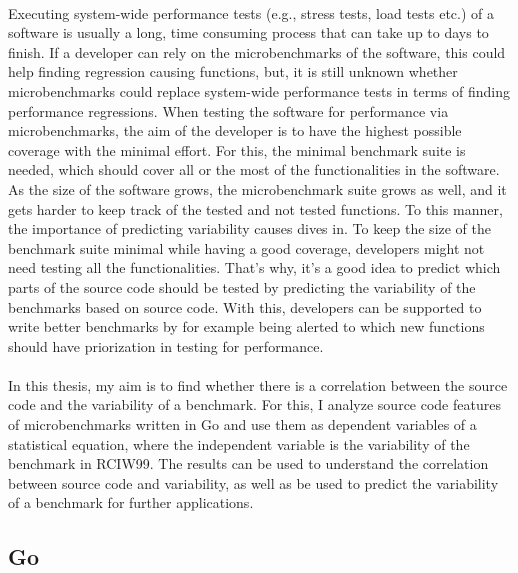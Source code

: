 \documentclass{seal_thesis}
\begin{document}
\\
Executing system-wide performance tests (e.g., stress tests, load tests etc.) of a software is usually a long, time consuming process that can take up to days to finish\cite{Laaber:2018:EOS:3196398.3196407}. If a developer can rely on the microbenchmarks of the software, this could help finding regression causing functions, but, it is still unknown whether microbenchmarks could replace system-wide performance tests in terms of finding performance regressions. When testing the software for performance via microbenchmarks, the aim of the developer is to have the highest possible coverage  with the minimal effort. For this, the minimal benchmark suite is needed, which should cover all or the most of the functionalities in the software. As the size of the software grows, the microbenchmark suite grows as well, and it gets harder to keep track of the tested and not tested functions. To this manner, the importance of predicting variability causes dives in. To keep the size of the benchmark suite minimal while having a good coverage, developers might not need testing all the functionalities. That's why, it's a good idea to predict which parts of the source code should be tested by predicting the variability of the benchmarks based on source code. With this, developers can be supported to write better benchmarks by for example being alerted to which new functions should have priorization in testing for performance.\\
\\
In this thesis, my aim is to find whether there is a correlation between the source code and the variability of a benchmark. For this, I analyze source code features of microbenchmarks written in Go and use them as dependent variables of a statistical equation,  where the independent variable is the variability of the benchmark in RCIW99. The results can be used to understand the correlation between source code and variability, as well as be used to predict the variability of a benchmark for further applications.\\

\subsection{Go}
\end{document}
